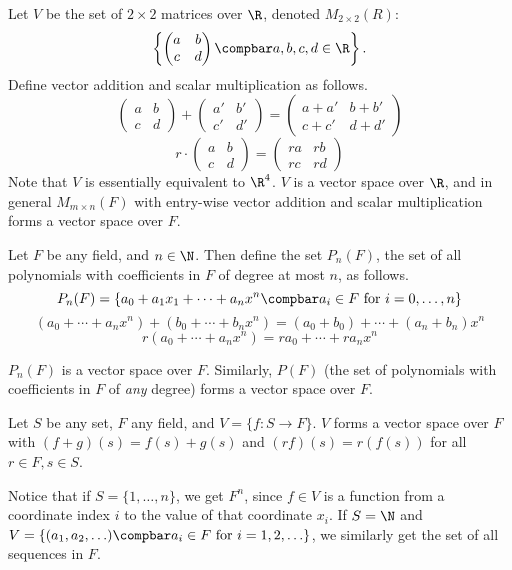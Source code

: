 \documentclass[12pt]{article}
\begin{document}
\begin{exmp}
    Let $V$ be the set of $2 \times 2$ matrices over $\R$, denoted $M_{2 \times 2}(R)$:
    \[\left\{\begin{pmatrix}
            a & b \\ c & d
        \end{pmatrix} \compbar a,b,c,d \in \R \right\}.\] Define vector addition and scalar multiplication as follows. \[\begin{pmatrix}
            a & b \\ c &d
        \end{pmatrix} + \begin{pmatrix}
            a' & b' \\ c' &d'
        \end{pmatrix} = \begin{pmatrix}
            a + a' & b + b' \\ c + c' &d + d'
        \end{pmatrix}\] \[r \cdot \begin{pmatrix}
            a & b \\ c &d
        \end{pmatrix} = \begin{pmatrix}
            ra & rb \\ rc &rd
        \end{pmatrix}\] Note that $V$ is essentially equivalent to $\R^4$. $V$ is a vector space over $\R$, and in general $M_{m\times n}(F)$ with entry-wise vector addition and scalar multiplication forms a vector space over $F$.
\end{exmp}

\begin{exmp}
    Let $F$ be any field, and $n \in \N$. Then define the set $P_n(F)$, the set of all polynomials with coefficients in $F$ of degree at most $n$, as follows. \[P_n(F) = \left\{a_0 + a_1x_1 + \cdots + a_nx^n \compbar a_i \in F \textrm{ for }i=0,\ldots,n\right\}\] \[(a_0 + \cdots + a_nx^n) + (b_0 + \cdots + b_nx^n) = (a_0 + b_0) + \cdots + (a_n + b_n)x^n\] \[r(a_0 + \cdots + a_nx^n) = ra_0 + \cdots + ra_nx^n\]

    $P_n(F)$ is a vector space over $F$. Similarly, $P(F)$ (the set of polynomials with coefficients in $F$ of \textit{any} degree) forms a vector space over $F$.
\end{exmp}

\begin{exmp}
    Let $S$ be any set, $F$ any field, and $V = \{f: S \to F\}$. $V$ forms a vector space over $F$ with $(f + g)(s) = f(s) + g(s)$ and $(rf)(s) = r(f(s))$ for all $r \in F, s \in S$.

    Notice that if $S = \{1, \ldots, n\}$, we get $F^n$, since $f \in V$ is a function from a coordinate index $i$ to the value of that coordinate $x_i$. If $S = \N$ and $V = \left\{(a_1, a_2, \ldots) \compbar a_i \in F \textrm{ for } i = 1, 2, \ldots\right\}$, we similarly get the set of all sequences in $F$.
\end{exmp}
\end{document}
